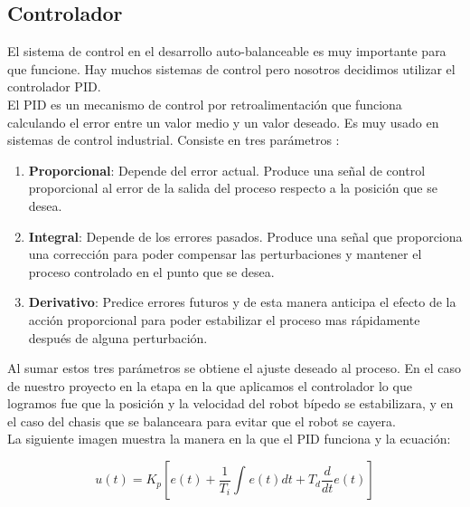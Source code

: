 \documentclass[10pt]{article}
\begin{document}
\subsection{Controlador}
El sistema de control en el desarrollo auto-balanceable es muy importante para que funcione. Hay muchos sistemas de control pero nosotros decidimos utilizar el controlador PID.\\
El PID es un mecanismo de control por retroalimentación  que funciona calculando el error entre un valor medio y un valor deseado. Es muy usado en sistemas de control industrial. Consiste en tres parámetros :\\
\begin{enumerate}
\item \textbf{Proporcional}: Depende del error actual. Produce una señal de control proporcional al error de la salida del proceso respecto a la posición que se desea.
\item \textbf{Integral}: Depende de los errores pasados. Produce una señal  que proporciona una corrección para poder compensar las perturbaciones y mantener el proceso controlado en el punto que se desea. 
\item \textbf{Derivativo}: Predice errores futuros y de esta manera anticipa el efecto de la acción proporcional para poder estabilizar el proceso mas rápidamente después de alguna perturbación.
\end{enumerate}
Al sumar estos tres parámetros  se obtiene el ajuste deseado  al proceso. En el caso de nuestro proyecto en la etapa en la que aplicamos el controlador lo que logramos fue que la posición y la velocidad del robot bípedo se estabilizara, y en el caso del chasis que se balanceara para evitar que el robot se cayera.\\
La siguiente imagen muestra la manera en la que el PID funciona y la ecuación:
\begin{center}
\begin{equation}
u(t) = K_p[e(t) + \frac{1}{T_i}\int_{}^{}e(t)dt + T_d\frac{d}{dt}e(t)]
\end{equation}
\end{center}
\end{document}
